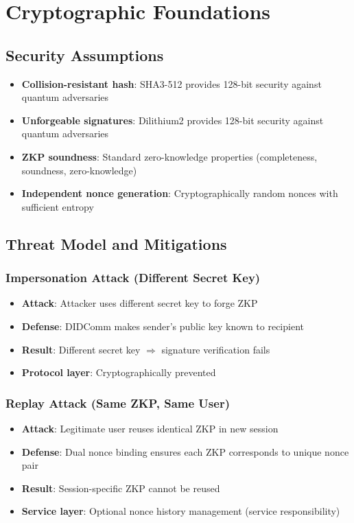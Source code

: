 \chapter{Cryptographic Foundations}

\section{Security Assumptions}

\begin{itemize}
  \item \textbf{Collision-resistant hash}: SHA3-512 provides 128-bit security against quantum adversaries
  \item \textbf{Unforgeable signatures}: Dilithium2 provides 128-bit security against quantum adversaries
  \item \textbf{ZKP soundness}: Standard zero-knowledge properties (completeness, soundness, zero-knowledge)
  \item \textbf{Independent nonce generation}: Cryptographically random nonces with sufficient entropy
\end{itemize}

\section{Threat Model and Mitigations}

\subsection{Impersonation Attack (Different Secret Key)}

\begin{itemize}
  \item \textbf{Attack}: Attacker uses different secret key to forge ZKP
  \item \textbf{Defense}: DIDComm makes sender's public key known to recipient
  \item \textbf{Result}: Different secret key $\Rightarrow$ signature verification fails
  \item \textbf{Protocol layer}: Cryptographically prevented
\end{itemize}

\subsection{Replay Attack (Same ZKP, Same User)}

\begin{itemize}
  \item \textbf{Attack}: Legitimate user reuses identical ZKP in new session
  \item \textbf{Defense}: Dual nonce binding ensures each ZKP corresponds to unique nonce pair
  \item \textbf{Result}: Session-specific ZKP cannot be reused
  \item \textbf{Service layer}: Optional nonce history management (service responsibility)
\end{itemize}

